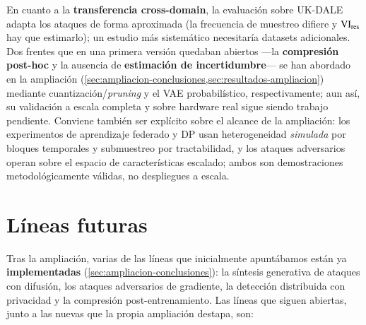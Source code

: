 En cuanto a la \textbf{transferencia cross-domain}, la evaluación sobre UK-DALE adapta los ataques de forma aproximada (la frecuencia de muestreo difiere y $\mathrm{VI}_{\text{res}}$ hay que estimarlo); un estudio más sistemático necesitaría datasets adicionales. Dos frentes que en una primera versión quedaban abiertos ---la \textbf{compresión post-hoc} y la ausencia de \textbf{estimación de incertidumbre}--- se han abordado en la ampliación (\cref{sec:ampliacion-conclusiones,sec:resultados-ampliacion}) mediante cuantización/\textit{pruning} y el VAE probabilístico, respectivamente; aun así, su validación a escala completa y sobre hardware real sigue siendo trabajo pendiente. Conviene también ser explícito sobre el alcance de la ampliación: los experimentos de aprendizaje federado y DP usan heterogeneidad \emph{simulada} por bloques temporales y submuestreo por tractabilidad, y los ataques adversarios operan sobre el espacio de características escalado; ambos son demostraciones metodológicamente válidas, no despliegues a escala.

\section{Líneas futuras}
\label{sec:lineas-futuras}

Tras la ampliación, varias de las líneas que inicialmente apuntábamos están ya \textbf{implementadas} (\cref{sec:ampliacion-conclusiones}): la síntesis generativa de ataques con difusión, los ataques adversarios de gradiente, la detección distribuida con privacidad y la compresión post-entrenamiento. Las líneas que siguen abiertas, junto a las nuevas que la propia ampliación destapa, son:

